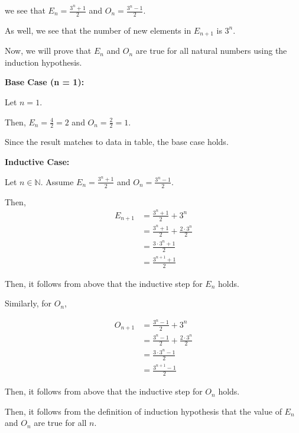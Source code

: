 \documentclass[12pt]{article}
\begin{document}
\begin{enumerate}
    \bigskip

    we see that $E_n = \frac{3^n + 1}{2}$ and $O_n = \frac{3^n - 1}{2}$.

    \bigskip

    As well, we see that the number of new elements in $E_{n+1}$ is $3^n$.

    \bigskip

    Now, we will prove that $E_n$ and $O_n$ are true for all natural numbers
    using the induction hypothesis.

    \bigskip

    \textbf{Base Case (n = 1):}

    \bigskip

    Let $n = 1$.

    \bigskip

    Then, $E_n = \frac{4}{2} = 2$ and $O_n = \frac{2}{2} = 1$.

    \bigskip

    Since the result matches to data in table, the base case holds.

    \bigskip

    \textbf{Inductive Case:}

    Let $n \in \mathbb{N}$. Assume $E_n = \frac{3^n + 1}{2}$ and $O_n = \frac{3^n - 1}{2}$.

    \bigskip

    Then,
    \setcounter{equation}{0}
    \begin{align}
        E_{n+1} &= \frac{3^n + 1}{2} + 3^n\\
        &= \frac{3^n + 1}{2} + \frac{2 \cdot 3^n}{2}\\
        &= \frac{3 \cdot 3^n + 1}{2}\\
        &= \frac{3^{n+1} + 1}{2}
    \end{align}

    \bigskip

    Then, it follows from above that the inductive step for $E_n$ holds.

    \bigskip

    Similarly, for $O_n$,

    \begin{align}
        O_{n+1} &= \frac{3^n - 1}{2} + 3^n\\
        &= \frac{3^n - 1}{2} + \frac{2 \cdot 3^n}{2}\\
        &= \frac{3 \cdot 3^n - 1}{2}\\
        &= \frac{3^{n+1} - 1}{2}
    \end{align}

    \bigskip

    Then, it follows from above that the inductive step for $O_n$ holds.

    \bigskip

    Then, it follows from the definition of induction hypothesis that the value of
    $E_n$ and $O_n$ are true for all $n$.

\end{enumerate}
\end{document}
